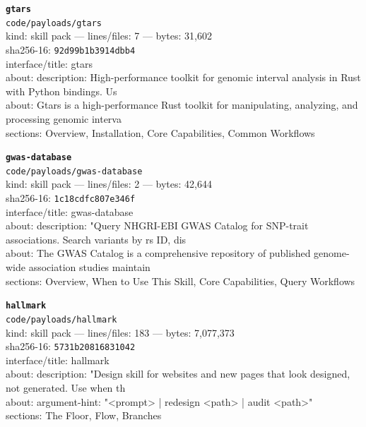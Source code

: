 \noindent\textbf{\texttt{gtars}}\\
\texttt{code/payloads/gtars}\\
kind: skill pack --- lines/files: 7 --- bytes: 31,602\\
sha256-16: \texttt{92d99b1b3914dbb4}\\
interface/title: gtars\\
about: description: High-performance toolkit for genomic interval analysis in Rust with Python bindings. Us\\
about: Gtars is a high-performance Rust toolkit for manipulating, analyzing, and processing genomic interva\\
sections: Overview, Installation, Core Capabilities, Common Workflows\\
\vspace*{6.0pt}

\noindent\textbf{\texttt{gwas-database}}\\
\texttt{code/payloads/gwas-database}\\
kind: skill pack --- lines/files: 2 --- bytes: 42,644\\
sha256-16: \texttt{1c18cdfc807e346f}\\
interface/title: gwas-database\\
about: description: "Query NHGRI-EBI GWAS Catalog for SNP-trait associations. Search variants by rs ID, dis\\
about: The GWAS Catalog is a comprehensive repository of published genome-wide association studies maintain\\
sections: Overview, When to Use This Skill, Core Capabilities, Query Workflows\\
\vspace*{6.0pt}

\noindent\textbf{\texttt{hallmark}}\\
\texttt{code/payloads/hallmark}\\
kind: skill pack --- lines/files: 183 --- bytes: 7,077,373\\
sha256-16: \texttt{5731b20816831042}\\
interface/title: hallmark\\
about: description: "Design skill for websites and new pages that look designed, not generated. Use when th\\
about: argument-hint: "<prompt> | redesign <path> | audit <path>"\\
sections: The Floor, Flow, Branches\\
\vspace*{6.0pt}


